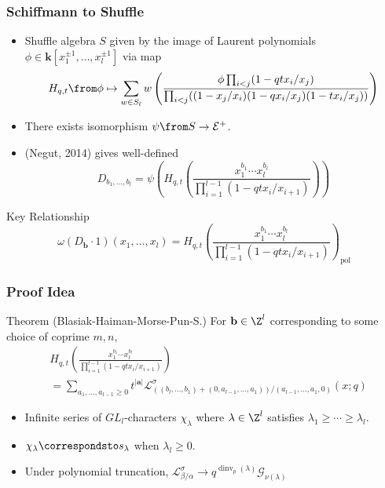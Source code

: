 \documentclass{beamer}
\DeclareMathOperator{\dinv}{dinv}
\newcommand{\Gcal}{\mathcal{G}}
\newcommand{\Lcal}{{\mathcal L}}
\newcommand{\Ecal}{{\mathcal E}}
\newcommand{\bb}{{\mathbf b}}
\newcommand{\aA}{{\mathbf a}}
\newcommand{\kk}{{\mathbf k}}
\DeclareMathOperator{\pol}{pol}
\begin{document}
\begin{frame}
  \frametitle{Schiffmann to Shuffle}
  \begin{itemize}
  \item Shuffle algebra \(S\) given by the image of Laurent
    polynomials \(\phi \in \kk[x_1^{\pm 1},\ldots, x_l^{\pm 1}]\) via
    map \pause\[
      H_{q,t}\from \phi \mapsto \sum_{w \in S_l} w \left( \frac{\phi \prod_{i<j}
          (1-qt x_i/x_j)}{\prod_{i<j}((1-x_j/x_i)(1-q x_i/x_j)(1-t x_i/x_j))} \right)
    \]\pause
  \item There exists isomorphism \(\psi \from S \to \Ecal^+\).\pause
  \item (Negut, 2014) gives well-defined \[
    D_{b_1,\ldots,b_l} = \psi \left(H_{q,t}\left(\frac{x_1^{b_1}\cdots
        x_l^{b_l}}{\prod_{i=1}^{l-1} (1-qt x_i/x_{i+1})}  \right)\right)
  \]\pause
  \end{itemize}
  \begin{block}{Key Relationship}
    \[
      \omega(D_\bb \cdot 1)(x_1,\ldots,x_l) = H_{q,t}\left(\frac{x_1^{b_1}\cdots
        x_l^{b_l}}{\prod_{i=1}^{l-1} (1-qt x_i/x_{i+1})}  \right)_{\pol}
    \]
  \end{block}
\end{frame}
\begin{frame}
  \frametitle{Proof Idea}
  \begin{block}{Theorem (Blasiak-Haiman-Morse-Pun-S.)}
    For \(\bb \in \Z^l\) corresponding to some choice of coprime \(m,n\),
    \begin{align*}
&H_{q,t}\left(\frac{x_1^{b_1}\cdots
                     x_l^{b_l}}{\prod_{i=1}^{l-1} (1-qt x_i/x_{i+1})}  \right)\\
      &= \sum_{a_1,\ldots,a_{l-1} \geq 0}
t^{|\aA|} \Lcal^\sigma_{((b_l,\ldots,b_1)+(0,a_{l-1},\ldots,a_1))/(a_{l-1},\ldots,a_1,0)}(x;q)
    \end{align*}
  \end{block}\pause
  \begin{itemize}
  \item Infinite series of \(GL_l\)-characters \(\chi_\lambda\) where
    \(\lambda \in \Z^l\) satisfies \(\lambda_1 \geq \cdots \geq
    \lambda_l\). \pause
  \item \(\chi_\lambda \correspondsto s_\lambda\) when \(\lambda_l \geq 0\).\pause
  \item Under polynomial truncation, \(\Lcal^\sigma_{\beta/\alpha} \to q^{\dinv_p(\lambda)}\Gcal_{\nu(\lambda)}\)
  \end{itemize}
\end{frame}
\end{document}

